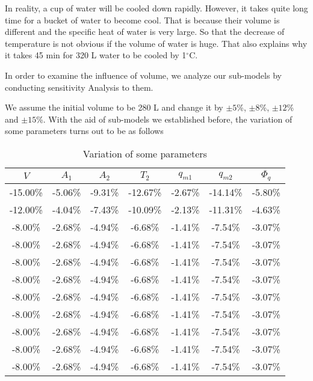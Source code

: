 In reality, a cup of water will be cooled down rapidly. However, it takes quite long time for a bucket of water to become cool. That is because their volume is different and the specific heat of water is very large. So that the decrease of temperature is not obvious if the volume of water is huge. That also explains why it takes 45 min for 320 L water to be cooled by 1$^\circ$C.

In order to examine the influence of volume, we analyze our sub-models
by conducting sensitivity Analysis to them.

We assume the initial volume to be 280 L and change it by $\pm 5$\%, $\pm 8$\%, $\pm 12$\% and $\pm 15$\%. With the aid of sub-models we established before, the variation of some parameters turns out to be as follows

\begin{table}[h] %
    \centering  %
    \caption{Variation of some parameters}  %
    \label{tab7} %
    \begin{tabular}{ccccccc} %
        \toprule  %
        $V$      & $A_1$   & $A_2$   & $T_2$    & $q_{m1}$ & $q_{m2}$ & $\Phi_q$ \\
        \midrule  %
        -15.00\% & -5.06\% & -9.31\% & -12.67\% & -2.67\%  & -14.14\% & -5.80\%  \\
        -12.00\% & -4.04\% & -7.43\% & -10.09\% & -2.13\%  & -11.31\% & -4.63\%  \\
        -8.00\%  & -2.68\% & -4.94\% & -6.68\%  & -1.41\%  & -7.54\%  & -3.07\%  \\
        -8.00\%  & -2.68\% & -4.94\% & -6.68\%  & -1.41\%  & -7.54\%  & -3.07\%  \\
        -8.00\%  & -2.68\% & -4.94\% & -6.68\%  & -1.41\%  & -7.54\%  & -3.07\%  \\
        -8.00\%  & -2.68\% & -4.94\% & -6.68\%  & -1.41\%  & -7.54\%  & -3.07\%  \\
        -8.00\%  & -2.68\% & -4.94\% & -6.68\%  & -1.41\%  & -7.54\%  & -3.07\%  \\
        -8.00\%  & -2.68\% & -4.94\% & -6.68\%  & -1.41\%  & -7.54\%  & -3.07\%  \\
        -8.00\%  & -2.68\% & -4.94\% & -6.68\%  & -1.41\%  & -7.54\%  & -3.07\%  \\
        -8.00\%  & -2.68\% & -4.94\% & -6.68\%  & -1.41\%  & -7.54\%  & -3.07\%  \\
        -8.00\%  & -2.68\% & -4.94\% & -6.68\%  & -1.41\%  & -7.54\%  & -3.07\%  \\
        \bottomrule  %
    \end{tabular}
\end{table}

